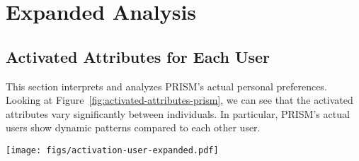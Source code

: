 \begin{table}[htbp]
  \centering{}
\caption{Hyperparameters used for the experiments.}
\label{app:hyperparameters}
  \vspace{-3 mm}
\end{table}

\section{Expanded Analysis}

\subsection{Activated Attributes for Each User}
\label{app:attributes-activation}
This section interprets and analyzes PRISM's actual personal preferences. Looking at Figure~\ref{fig:activated-attributes-prism}, we can see that the activated attributes vary significantly between individuals. In particular, PRISM's actual users show dynamic patterns compared to each other user.


\begin{figure*}[ht]
\centering
\texttt{[image: figs/activation-user-expanded.pdf]}
\caption{For each user in PRISM, there is a $W-L$ (Win-Loss) value for each attribute. The higher this value is, the more that user can be interpreted as preferring that attribute.
}
\label{fig:activated-attributes-prism}
\vspace{-3mm}
\end{figure*}



